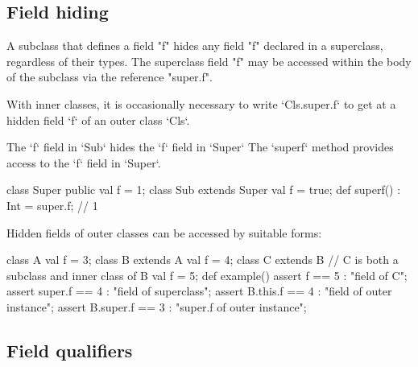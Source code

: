 \subsection{Field hiding}
\label{sect:FieldHiding}


A subclass that defines a field \xcd"f" hides any field \xcd"f"
declared in a superclass, regardless of their types.  The
superclass field \xcd"f" may be accessed within the body of
the subclass via the reference \xcd"super.f".

With inner classes, it is occasionally necessary to 
write \xcd`Cls.super.f` to get at a hidden field \xcd`f` of an outer class
\xcd`Cls`. 

\begin{ex}
The \xcd`f` field in \xcd`Sub` hides the \xcd`f` field in \xcd`Super`
The \xcd`superf` method provides access to the \xcd`f` field in \xcd`Super`.
\begin{xten}
class Super{ 
  public val f = 1; 
}
class Sub extends Super {
  val f = true;
  def superf() : Int = super.f; // 1
}
\end{xten}
\end{ex}

\begin{ex}
Hidden fields of outer classes can be accessed by suitable forms: 
\begin{xten}
class A {
   val f = 3;
}
class B extends A {
   val f = 4;
   class C extends B {
      // C is both a subclass and inner class of B
      val f = 5;
       def example() {
         assert f         == 5 : "field of C";
         assert super.f   == 4 : "field of superclass";
         assert B.this.f  == 4 : "field of outer instance";
         assert B.super.f == 3 : "super.f of outer instance";
       }
    }
}
\end{xten}
\end{ex}

\subsection{Field qualifiers}
\label{FieldQualifier}

